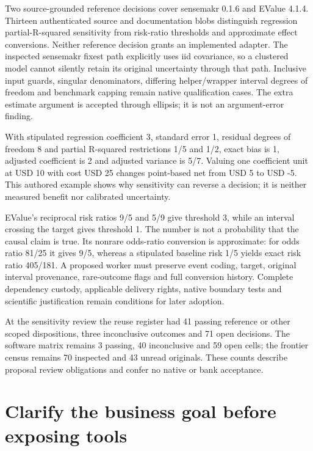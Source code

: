 Two source-grounded reference decisions cover sensemakr 0.1.6 and EValue
4.1.4. Thirteen authenticated source and documentation blobs distinguish
regression partial-R-squared sensitivity from risk-ratio thresholds and
approximate effect conversions. Neither reference decision grants an
implemented adapter. The inspected sensemakr fixest path explicitly uses
iid covariance, so a clustered model cannot silently retain its original
uncertainty through that path. Inclusive input guards, singular
denominators, differing helper/wrapper interval degrees of freedom and
benchmark capping remain native qualification cases. The extra estimate
argument is accepted through ellipsis; it is not an argument-error
finding. \citep{exec23_sensitivity_sensemakr}

With stipulated regression coefficient 3, standard error 1, residual
degrees of freedom 8 and partial R-squared restrictions 1/5 and 1/2,
exact bias is 1, adjusted coefficient is 2 and adjusted variance is 5/7.
Valuing one coefficient unit at USD 10 with cost USD 25 changes
point-based net from USD 5 to USD -5. This authored example shows why
sensitivity can reverse a decision; it is neither measured benefit nor
calibrated uncertainty. \citep{exec23_sensitivity_reference}

EValue's reciprocal risk ratios 9/5 and 5/9 give threshold 3, while an
interval crossing the target gives threshold 1. The number is not a
probability that the causal claim is true. Its nonrare odds-ratio
conversion is approximate: for odds ratio 81/25 it gives 9/5, whereas a
stipulated baseline risk 1/5 yields exact risk ratio 405/181. A proposed
worker must preserve event coding, target, original interval provenance,
rare-outcome flags and full conversion history. Complete dependency
custody, applicable delivery rights, native boundary tests and
scientific justification remain conditions for later adoption.
\citep{exec23_sensitivity_evalue,exec23_sensitivity_reference}

At the sensitivity review the reuse register had 41 passing reference or
other scoped dispositions, three inconclusive outcomes and 71 open
decisions. The software matrix remains 3 passing, 40 inconclusive and 59
open cells; the frontier census remains 70 inspected and 43 unread
originals. These counts describe proposal review obligations and confer
no native or bank acceptance.
\citep{sp23sensitivity_reader,sp23sensitivity_progress}

\hypertarget{clarify-the-business-goal-before-exposing-tools}{%
\section{Clarify the business goal before exposing
tools}\label{clarify-the-business-goal-before-exposing-tools}}

